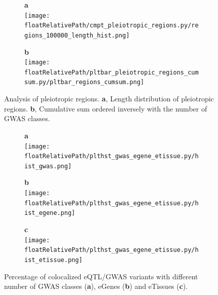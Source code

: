 %
\begin{figure}[!tbp]
\centering
%
\begin{subfigure}[]{.33\textwidth}
\textbf{a}
\\
\texttt{[image: \\floatRelativePath/cmpt\_pleiotropic\_regions.py/regions\_100000\_length\_hist.png]}
\end{subfigure}
%
\begin{subfigure}[]{.33\textwidth}
\textbf{b}
\\
\texttt{[image: \\floatRelativePath/pltbar\_pleiotropic\_regions\_cumsum.py/pltbar\_regions\_cumsum.png]}
\end{subfigure}
%
\caption{Analysis of pleiotropic regions. \textbf{a}, Length distribution of pleiotropic regions. \textbf{b}, Cumulative sum ordered inversely with the number of GWAS classes.} \label{fig:pleiotropy_region_distribution}
\end{figure}
%
%
\begin{figure}[!tbp]
\centering
%
\begin{subfigure}[]{.32\textwidth}
\textbf{a}
\\
\texttt{[image: \\floatRelativePath/plthst\_gwas\_egene\_etissue.py/hist\_gwas.png]}
\end{subfigure}
%
\begin{subfigure}[]{.32\textwidth}
\textbf{b}
\\
\texttt{[image: \\floatRelativePath/plthst\_gwas\_egene\_etissue.py/hist\_egene.png]}
\end{subfigure}
%
\begin{subfigure}[]{.32\textwidth}
\textbf{c}
\\
\texttt{[image: \\floatRelativePath/plthst\_gwas\_egene\_etissue.py/hist\_etissue.png]}
\end{subfigure}
%
\caption{Percentage of colocalized eQTL/GWAS variants with different number of GWAS classes (\textbf{a}), eGenes (\textbf{b}) and eTissues (\textbf{c}).} \label{fig:hist_gwas_egene_etissue}
\end{figure}
